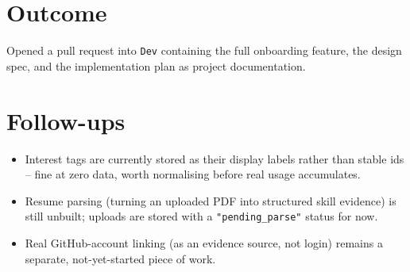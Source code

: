 \documentclass[11pt,a4paper]{article}
\begin{document}
\section{Outcome}
Opened a pull request into \texttt{Dev} containing the full
onboarding feature, the design spec, and the implementation plan
as project documentation.

\section{Follow-ups}
\begin{itemize}[leftmargin=0.7cm]
  \item Interest tags are currently stored as their display
    labels rather than stable ids -- fine at zero data, worth
    normalising before real usage accumulates.
  \item Resume parsing (turning an uploaded PDF into structured
    skill evidence) is still unbuilt; uploads are stored with a
    \texttt{"pending\_parse"} status for now.
  \item Real GitHub-account linking (as an evidence source, not
    login) remains a separate, not-yet-started piece of work.
\end{itemize}
\end{document}
